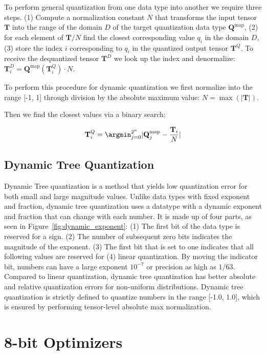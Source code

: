To perform general quantization from one data type into another we require three steps. (1) Compute a normalization constant $N$ that transforms the input tensor $\mathbf{T}$ into the range of the domain $D$ of the target quantization data type ${\mathbf{Q}^{\text{map}}}$, (2) for each element of $\mathbf{T}/N$ find the closest corresponding value $q_i$ in the domain $D$, (3) store the index $i$ corresponding to $q_i$ in the quantized output tensor $\mathbf{T}^Q$. To receive the dequantized tensor $\mathbf{T}^D$ we look up the index and denormalize: $\mathbf{T}^D_i = {\mathbf{Q}^{\text{map}}}(\mathbf{T}^Q_i)\cdot N$.

To perform this procedure for dynamic quantization we first normalize into the range [-1, 1] through division by the absolute maximum value: $N = \max(|\mathbf{T}|)$.

Then we find the closest values via a binary search:

\begin{equation}
    \mathbf{T}_i^Q = \argmin_{j=0}^{2^n} |\mathbf{Q}^{\text{map}}_j - \frac{\mathbf{T}_i}{N}|
\end{equation}

\subsection{Dynamic Tree Quantization}
 \label{section:dynamictreequant}

Dynamic Tree quantization \citep{dettmers20168bit} is a method that yields low quantization error for both small and large magnitude values. Unlike data types with fixed exponent and fraction, dynamic tree quantization uses a datatype with a dynamic exponent and fraction that can change with each number. It is made up of four parts, as seen in Figure~\ref{fig:dynamic_exponent}: (1) The first bit of the data type is reserved for a sign. (2) The number of subsequent zero bits indicates the magnitude of the exponent. (3) The first bit that is set to one indicates that all following values are reserved for (4) linear quantization. By moving the indicator bit, numbers can have a large exponent $10^{-7}$ or precision as high as $1/63$. Compared to linear quantization, dynamic tree quantization has better absolute and relative quantization errors for non-uniform distributions. Dynamic tree quantization is strictly defined to quantize numbers in the range [-1.0, 1.0], which is ensured by performing tensor-level absolute max normalization. 

\section{8-bit Optimizers}
\label{section:8bit_optim}

